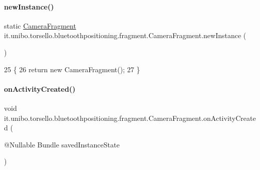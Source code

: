 \paragraph{\texorpdfstring{new\+Instance()}{newInstance()}}
{\footnotesize\ttfamily static \hyperlink{classit_1_1unibo_1_1torsello_1_1bluetoothpositioning_1_1fragment_1_1CameraFragment}{Camera\+Fragment} it.\+unibo.\+torsello.\+bluetoothpositioning.\+fragment.\+Camera\+Fragment.\+new\+Instance (\begin{DoxyParamCaption}{ }\end{DoxyParamCaption})\hspace{0.3cm}{\ttfamily [static]}}


\begin{DoxyCode}
25                                                \{
26         \textcolor{keywordflow}{return} \textcolor{keyword}{new} CameraFragment();
27     \}
\end{DoxyCode}
\hypertarget{classit_1_1unibo_1_1torsello_1_1bluetoothpositioning_1_1fragment_1_1CameraFragment_a3af6cb206d2194e7d580cf511a97d6f1_a3af6cb206d2194e7d580cf511a97d6f1}{}\label{classit_1_1unibo_1_1torsello_1_1bluetoothpositioning_1_1fragment_1_1CameraFragment_a3af6cb206d2194e7d580cf511a97d6f1_a3af6cb206d2194e7d580cf511a97d6f1} 
\paragraph{\texorpdfstring{on\+Activity\+Created()}{onActivityCreated()}}
{\footnotesize\ttfamily void it.\+unibo.\+torsello.\+bluetoothpositioning.\+fragment.\+Camera\+Fragment.\+on\+Activity\+Created (\begin{DoxyParamCaption}\item[{@Nullable Bundle}]{saved\+Instance\+State }\end{DoxyParamCaption})}


